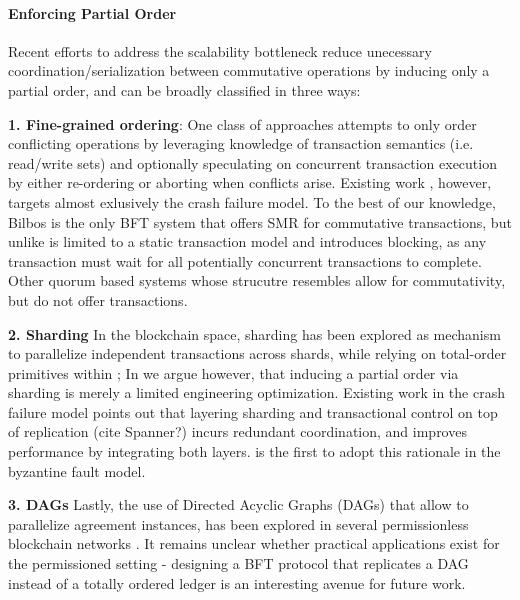 \paragraph{Enforcing Partial Order}
Recent efforts to address the scalability bottleneck reduce unecessary coordination/serialization between commutative operations by inducing only a partial order, and can be broadly classified in three ways:

\textbf{1. Fine-grained ordering}: One class of approaches attempts to only order conflicting operations by leveraging knowledge of transaction semantics (i.e. read/write sets) and optionally speculating on concurrent transaction execution by either re-ordering or aborting when conflicts arise. Existing work \cite{moraru2013there, lamport2005generalized, sutra2011fast, li2012redblue, park2019exploiting, yan2018carousel, mu2016consolidating, zhang2015tapir, kraska2013mdcc}, however, targets almost exlusively the crash failure model. To the best of our knowledge, Bilbos \cite{bazzi2018clairvoyant} is the only BFT system that offers SMR for commutative transactions, but unlike \sys is limited to a static transaction model and introduces blocking, as any transaction must wait for all potentially concurrent transactions to complete. Other quorum based systems whose strucutre \sys resembles \cite{malkhi1998byzantine, abd2005fault, cowling2006hq, liskov2006tolerating} allow for commutativity, but do not offer transactions. 

\textbf{2. Sharding} In the blockchain space, sharding has been explored as mechanism to parallelize independent transactions across shards, while relying on total-order primitives within \cite{zamani2018rapidchain, al2017chainspace, kokoris2018omniledger}; In \sys we argue however, that inducing a partial order via sharding is merely a limited engineering optimization. Existing work in the crash failure model \cite{zhang2016operation, zhang2015tapir, mu2016consolidating } points out that layering sharding and transactional control on top of replication (cite Spanner?) incurs redundant coordination, and improves performance by integrating both layers. \sys is the first to adopt this rationale in the byzantine fault model.

\textbf{3. DAGs} Lastly, the use of Directed Acyclic Graphs (DAGs) that allow to parallelize agreement instances, has been explored in several permissionless blockchain networks \cite{pervez2018comparative, popov2016tangle, rocket2018snowflake}. It remains unclear whether practical applications exist for the permissioned setting - designing a BFT protocol that replicates a DAG instead of a totally ordered ledger is an interesting avenue for future work.



